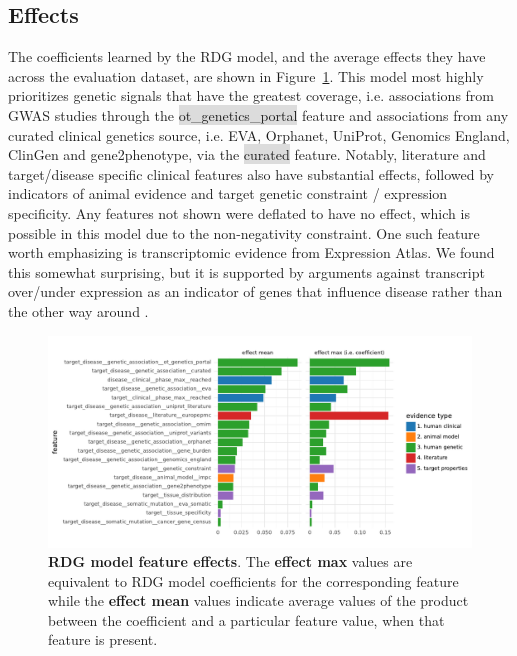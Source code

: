 \documentclass{article}
\begin{document}
\subsection{Effects}
\label{sec:effects}

The coefficients learned by the RDG model, and the average effects they have across the evaluation dataset, are shown in Figure~\ref{fig:effect_sizes}. This model most highly prioritizes genetic signals that have the greatest coverage, i.e. associations from GWAS studies through the \colorbox{Gainsboro}{ot\_genetics\_portal} feature and associations from any curated clinical genetics source, i.e. EVA, Orphanet, UniProt, Genomics England, ClinGen and gene2phenotype, via the \colorbox{Gainsboro}{curated} \vspace*{0mm} feature.  Notably, literature and target/disease specific clinical features also have substantial effects, followed by indicators of animal evidence and target genetic constraint / expression specificity. Any features not shown were deflated to have no effect, which is possible in this model due to the non-negativity constraint. One such feature worth emphasizing is transcriptomic evidence from Expression Atlas. We found this somewhat surprising, but it is supported by arguments against transcript over/under expression as an indicator of genes that influence disease rather than the other way around \cite{PMID:34561431}.

\begin{figure}[!htb]
	\centering
  \captionsetup{width=.9\linewidth}
	\includegraphics[width=1\textwidth]{effect_sizes.pdf}
  \caption{
    \textbf{RDG model feature effects}. The \textbf{effect max} values are equivalent to RDG model coefficients for the corresponding feature while the \textbf{effect mean} values indicate average values of the product between the coefficient and a particular feature value, when that feature is present.
  }
	\label{fig:effect_sizes}
\end{figure}
\end{document}
